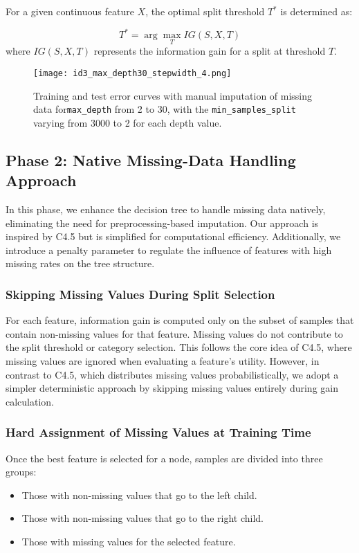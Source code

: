 \documentclass[12pt]{article}
\begin{document}
For a given continuous feature $X$, the optimal split threshold $T^*$ is determined as:

\begin{equation}
T^* = \arg\max_T IG(S, X, T)
\end{equation}
where $IG(S, X, T)$ represents the information gain for a split at threshold $T$.

\begin{figure}
    \centering
    \texttt{[image: id3\_max\_depth30\_stepwidth\_4.png]}
    \caption{Training and test error curves with manual imputation of missing data for\texttt{max\_depth} from 2 to 30, with the \texttt{min\_samples\_split} varying from 3000 to 2 for each depth value.}
    \label{fig:enter-label}
\end{figure}

\FloatBarrier

\subsection{Phase 2: Native Missing-Data Handling Approach}

In this phase, we enhance the decision tree to handle missing data natively, eliminating the need for preprocessing-based imputation. Our approach is inspired by C4.5 but is simplified for computational efficiency. Additionally, we introduce a penalty parameter to regulate the influence of features with high missing rates on the tree structure.

\subsubsection{Skipping Missing Values During Split Selection}
For each feature, information gain is computed only on the subset of samples that contain non-missing values for that feature. Missing values do not contribute to the split threshold or category selection. This follows the core idea of C4.5, where missing values are ignored when evaluating a feature’s utility. However, in contrast to C4.5, which distributes missing values probabilistically, we adopt a simpler deterministic approach by skipping missing values entirely during gain calculation.

\subsubsection{Hard Assignment of Missing Values at Training Time}
Once the best feature is selected for a node, samples are divided into three groups:
\begin{itemize}
    \item Those with non-missing values that go to the left child.
    \item Those with non-missing values that go to the right child.
    \item Those with missing values for the selected feature.
\end{itemize}
\end{document}
